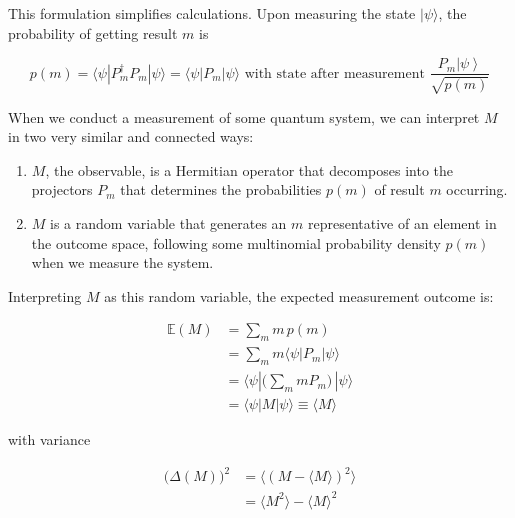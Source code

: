 \documentclass{article}
\newcommand{\ket}[1]{\ensuremath{\left|#1\right\rangle}}
\theoremstyle{definition}
\begin{document}
      This formulation simplifies calculations. Upon measuring the state $|\psi\rangle$, the probability of getting result $m$ is

        \[p(m) = \langle \psi | P_m^\dagger P_m | \psi \rangle = \langle \psi | P_m | \psi \rangle \text{ with state after measurement } \frac{P_m  \ket{\psi}}{\sqrt{p(m)}}\]

      When we conduct a measurement of some quantum system, we can interpret $M$ in two very similar and connected ways:

      \begin{enumerate}
        \item $M$, the observable, is a Hermitian operator that decomposes into the projectors $P_m$ that determines the probabilities $p(m)$ of result $m$ occurring.
        \item $M$ is a random variable that generates an $m$ representative of an element in the outcome space, following some multinomial probability density $p(m)$ when we measure the system.
      \end{enumerate}

      Interpreting $M$ as this random variable, the expected measurement outcome is:

      \begin{align*}
        \mathbb{E}(M) & = \sum_m m\, p(m) \\
        & = \sum_m m \langle \psi | P_m | \psi \rangle \\
        & = \langle \psi | \bigg( \sum_m m P_m \bigg) \, | \psi \rangle \\
        & = \langle \psi | M | \psi \rangle \equiv \langle M \rangle
      \end{align*}

      with variance

      \begin{align*}
        \big( \Delta (M)\big)^2 & = \langle (M - \langle M \rangle )^2 \rangle \\
        & = \langle M^2 \rangle - \langle M \rangle^2
      \end{align*}
\end{document}
